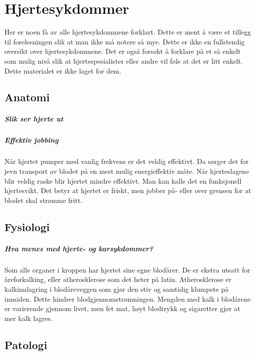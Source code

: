 	\chapter{Hjertesykdommer}
		Her er noen få av alle hjertesykdommene forklart. Dette er ment å være et tillegg til forelesningen slik at man ikke må notere så mye. Dette er ikke en fullstendig oversikt over hjertesykdommene. Det er også forsøkt å forklare på et så enkelt som mulig nivå slik at hjertespesialister eller andre vil føle at det er litt enkelt. Dette materialet er ikke laget for dem.\\
		\section{Anatomi}
			\paragraph{Slik ser hjerte ut\\}
			\paragraph{Effektiv jobbing\\}
				Når hjertet pumper med vanlig frekvens er det veldig effektivt. Da sørger det for jevn transport av blodet på en mest mulig energieffektiv måte. Når hjerteslagene blir veldig raske blir hjertet mindre effektivt\cite{FA-saladin}. Man kan kalle det en funksjonell hjertesvikt. Det betyr at hjertet er friskt, men jobber på- eller over grensen for at blodet skal strømme fritt.
		\section{Fysiologi}	
			\paragraph{Hva menes med hjerte- og karsykdommer?\\}\label{sec:athero}
				Som alle organer i kroppen har hjertet sine egne blodårer. De er ekstra utsatt for åreforkalking, eller atherosklerose som det heter på latin. Atherosklerose er kalkinnlagring i blodåreveggen som gjør den stiv og samtidig klumpete på innsiden. Dette hindrer blodgjennomstrømningen. Mengden med kalk i blodårene er varierende gjennom livet, men fet mat, høyt blodtrykk og sigaretter gjør at mer kalk lagres. 
		\section{Patologi}	
